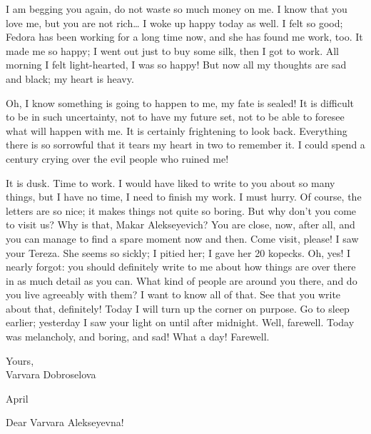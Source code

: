 I am begging you again, do not waste so much money on me. I know that you love me, but you are not rich\ldots{} I woke up happy today as well. I felt so good; Fedora has been working for a long time now, and she has found me work, too. It made me so happy; I went out just to buy some silk, then I got to work. All morning I felt light-hearted, I was so happy! But now all my thoughts are sad and black; my heart is heavy.

Oh, I know something is going to happen to me, my fate is sealed! It is difficult to be in such uncertainty, not to have my future set, not to be able to foresee what will happen with me. It is certainly frightening to look back. Everything there is so sorrowful that it tears my heart in two to remember it. I could spend a century crying over the evil people who ruined me!

It is dusk. Time to work. I would have liked to write to you about so many things, but I have no time, I need to finish my work. I must hurry. Of course, the letters are so nice; it makes things not quite so boring. But why don't you come to visit us? Why is that, Makar Alekseyevich? You are close, now, after all, and you can manage to find a spare moment now and then. Come visit, please! I saw your Tereza. She seems so sickly; I pitied her; I gave her 20 kopecks. Oh, yes! I nearly forgot: you should definitely write to me about how things are over there in as much detail as you can. What kind of people are around you there, and do you live agreeably with them? I want to know all of that. See that you write about that, definitely! Today I will turn up the corner on purpose. Go to sleep earlier; yesterday I saw your light on until after midnight. Well, farewell. Today was melancholy, and boring, and sad! What a day! Farewell.

\begin{flushright}
	Yours,\\
	Varvara Dobroselova
\end{flushright}

\begin{flushright}
	April 
\end{flushright}

\noindent Dear Varvara Alekseyevna!

